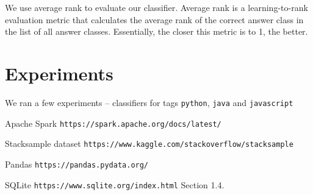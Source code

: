 \documentclass{article}
\begin{document}
We use average rank to evaluate our classifier. Average rank is a learning-to-rank evaluation metric that calculates the average rank of the correct answer class in the list of all answer classes. Essentially, the closer this metric is to 1, the better.

\section{Experiments}
We ran a few experiments -- classifiers for tags \texttt{python}, \texttt{java} and \texttt{javascript}

\begin{thebibliography}{1}
	
	 Apache Spark \texttt{https://spark.apache.org/docs/latest/}
	
	 Stacksample dataset \texttt{https://www.kaggle.com/stackoverflow/stacksample}
	
	 Pandas \texttt{https://pandas.pydata.org/} 
	
	 SQLite \texttt{https://www.sqlite.org/index.html} Section 1.4.
	
\end{thebibliography}
\end{document}
